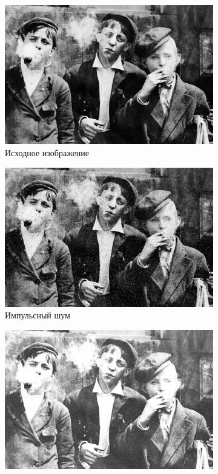 \begin{figure}[ht!] 
  \centering
  \begin{subfigure}[b]{0.5\linewidth}
      \centering
      \includegraphics[width=0.95\linewidth]{../lewis-hine-taschen-main-3.jpg} 
      \caption{Исходное изображение} 
      \vspace{4ex}
  \end{subfigure}%
  \begin{subfigure}[b]{0.5\linewidth}
    \centering
    \includegraphics[width=0.95\linewidth]{../Adaptive_Median_Filter/Adaptive_Median_Impulse_noise_k=9.jpg} 
    \caption{Импульсный шум} 
    \vspace{4ex}
  \end{subfigure}
  \begin{subfigure}[b]{0.5\linewidth}
    \centering
    \includegraphics[width=0.95\linewidth]{../Adaptive_Median_Filter/Adaptive_Median_Additive_noise_k=9.jpg} 

\end{subfigure}
\end{figure}
